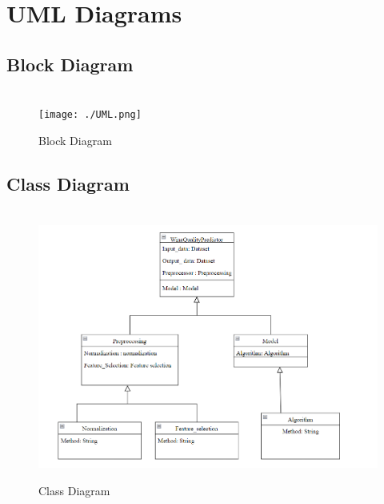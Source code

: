 \documentclass[a4paper, 12pt]{report}
\begin{document}
\section{UML Diagrams}
\subsection{Block Diagram }
\begin{figure}[h]
\centering
\\
\texttt{[image: ./UML.png]}
\\
\caption{Block Diagram}
\end{figure}
\pagebreak

\subsection{Class Diagram }
\begin{figure}[h]
\centering
\\
\includegraphics[width=0.9\linewidth]{./Wine Class diagram.png}
\caption{Class Diagram}
\end{figure}
\pagebreak
\end{document}
